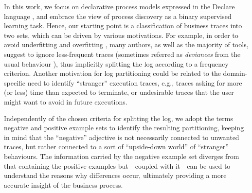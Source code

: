 In this work, we focus on declarative process models expressed in the Declare language \cite{2008-Pesic}, and embrace the view of process discovery as a binary supervised learning task. Hence, our starting point is a classification of business traces into two sets, which can be driven by various motivations.
For example, in order to avoid underfitting and overfitting \cite{2010-Aalst}, many authors, as well as the majority of tools, suggest to ignore less-frequent traces (sometimes referred as \emph{deviances} from the usual behaviour \cite{2016-Nguyen}), thus implicitly splitting the log according to a frequency criterion. Another motivation for log partitioning could be related to the domain-specific need to identify ``stranger'' execution traces, e.g., traces asking for more (or less) time than expected to terminate, or undesirable traces that the user might want to avoid in future executions.


%
Independently of the chosen criteria for splitting the log, we adopt the terms negative and positive example sets to identify the resulting partitioning, keeping in mind that the ``negative'' adjective is not necessarily connected to unwanted traces, but rather connected to a sort of ``upside-down world'' of ``stranger'' behaviours. The information carried by the negative example set diverges from that containing the positive examples but---coupled with it---can be used to understand the reasons why differences occur, ultimately providing a more accurate insight of the business process. 


